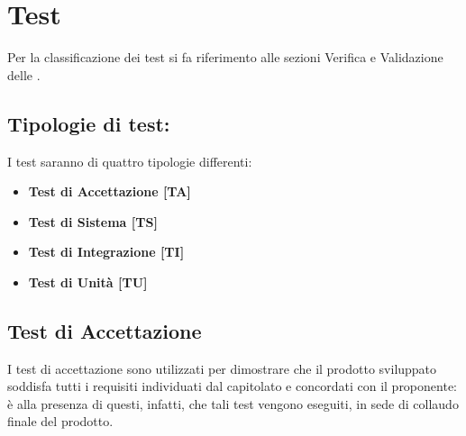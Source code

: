 \section{Test}
	Per la classificazione dei test si fa riferimento alle sezioni Verifica e Validazione delle .
	

	\subsection{Tipologie di test:}
		I test saranno di quattro tipologie differenti:
		\begin{itemize}

			\item \textbf{Test di Accettazione [TA]}
			\item \textbf{Test di Sistema [TS]}
			\item \textbf{Test di Integrazione [TI]}
			\item \textbf{Test di Unità [TU]}

		\end{itemize}

	\subsection{Test di Accettazione}
	
		I test di accettazione sono utilizzati per dimostrare che il prodotto sviluppato soddisfa tutti i requisiti individuati dal capitolato e concordati con il proponente: è alla presenza di questi, infatti, che tali test vengono eseguiti, in sede di collaudo finale del prodotto.
		
